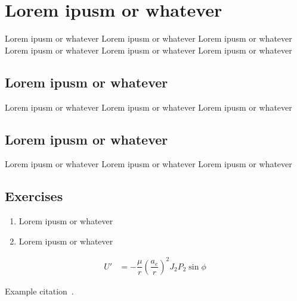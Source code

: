 \chapter{Lorem ipusm or whatever}
\label{chap:reference-frames}

Lorem ipusm or whatever Lorem ipusm or whatever Lorem ipusm or whatever 
Lorem ipusm or whatever Lorem ipusm or whatever Lorem ipusm or whatever

\section{Lorem ipusm or whatever}
\label{sec:reference-frames-overview}

Lorem ipusm or whatever Lorem ipusm or whatever Lorem ipusm or whatever

\section{Lorem ipusm or whatever}

Lorem ipusm or whatever Lorem ipusm or whatever Lorem ipusm or whatever

\section{Exercises}

\begin{enumerate}
    \item Lorem ipusm or whatever
    \item Lorem ipusm or whatever
\end{enumerate}

\begin{align}
    U' 
        &= -\dfrac{\mu}{r} \left( \dfrac{a_e}{r} \right)^2 J_2 P_2 \sin \phi
\end{align}

Example citation~\cite{example-reference}.
